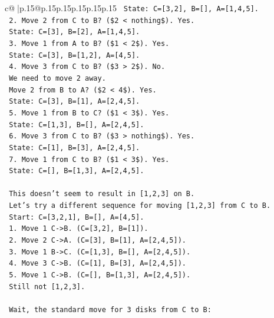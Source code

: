 \documentclass{article}
\begin{document}
{\begin{supertabular}{c@{$\;$}|p{.15\linewidth}@{}p{.15\linewidth}p{.15\linewidth}p{.15\linewidth}p{.15\linewidth}p{.15\linewidth}}
{{{\texttt{      State: C={[}3,2{]}, B={[}{]}, A={[}1,4,5{]}.} \\
\texttt{   2. Move 2 from C to B? (\$2 < nothing\$). Yes.} \\
\texttt{      State: C={[}3{]}, B={[}2{]}, A={[}1,4,5{]}.} \\
\texttt{   3. Move 1 from A to B? (\$1 < 2\$). Yes.} \\
\texttt{      State: C={[}3{]}, B={[}1,2{]}, A={[}4,5{]}.} \\
\texttt{   4. Move 3 from C to B? (\$3 > 2\$). No.} \\
\texttt{      We need to move 2 away.} \\
\texttt{      Move 2 from B to A? (\$2 < 4\$). Yes.} \\
\texttt{      State: C={[}3{]}, B={[}1{]}, A={[}2,4,5{]}.} \\
\texttt{   5. Move 1 from B to C? (\$1 < 3\$). Yes.} \\
\texttt{      State: C={[}1,3{]}, B={[}{]}, A={[}2,4,5{]}.} \\
\texttt{   6. Move 3 from C to B? (\$3 > nothing\$). Yes.} \\
\texttt{      State: C={[}1{]}, B={[}3{]}, A={[}2,4,5{]}.} \\
\texttt{   7. Move 1 from C to B? (\$1 < 3\$). Yes.} \\
\texttt{      State: C={[}{]}, B={[}1,3{]}, A={[}2,4,5{]}.} \\
\\ 
\texttt{   This doesn't seem to result in {[}1,2,3{]} on B.} \\
\texttt{   Let's try a different sequence for moving {[}1,2,3{]} from C to B.} \\
\texttt{   Start: C={[}3,2,1{]}, B={[}{]}, A={[}4,5{]}.} \\
\texttt{   1. Move 1 C{-}>B. (C={[}3,2{]}, B={[}1{]}).} \\
\texttt{   2. Move 2 C{-}>A. (C={[}3{]}, B={[}1{]}, A={[}2,4,5{]}).} \\
\texttt{   3. Move 1 B{-}>C. (C={[}1,3{]}, B={[}{]}, A={[}2,4,5{]}).} \\
\texttt{   4. Move 3 C{-}>B. (C={[}1{]}, B={[}3{]}, A={[}2,4,5{]}).} \\
\texttt{   5. Move 1 C{-}>B. (C={[}{]}, B={[}1,3{]}, A={[}2,4,5{]}).} \\
\texttt{   Still not {[}1,2,3{]}.} \\
\\ 
\texttt{   Wait, the standard move for 3 disks from C to B:} \\
}}}
\end{supertabular}}
\end{document}
